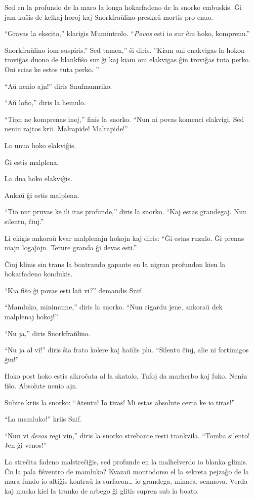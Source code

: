 Sed en la profundo de la maro la longa hokarfadeno de la snorko embuskis. Ĝi jam kuŝis de kelkaj horoj kaj Snorkfraŭlino preskaŭ mortis pro enuo.

``Gravas la ekscito,'' klarigis Mumintrolo. ``\emph{Povas} esti io sur ĉiu hoko, komprenu.''

Snorkfraŭlino iom suspiris.'' Sed tamen,'' ŝi diris. ''Kiam oni enakvigas la hokon troviĝas duono de blankfiŝo sur ĝi kaj kiam oni elakvigas ĝin troviĝas tuta perko. Oni scias ke estos tuta perko. ''

``Aŭ nenio ajn!'' diris Snufmumriko.

``Aŭ lofio,'' diris la hemulo.

``Tion ne komprenas inoj,'' finis la snorko. ``Nun ni povas komenci elakvigi. Sed neniu rajtos krii. Malrapide! Malrapide!''

La unua hoko elakviĝis.

Ĝi estis malplena.

La dua hoko elakviĝis.

Ankaŭ ĝi estis malplena.

``Tio nur pruvas ke ili iras profunde,'' diris la snorko. ``Kaj estas grandegaj. Nun silentu, ĉiuj.''

Li ekigis ankoraŭ kvar malplenajn hokojn kaj diris: ``Ĝi estas ruzulo. Ĝi prenas niajn logaĵojn. Terure granda ĝi devas esti.''

Ĉiuj klinis sin trans la boatrando gapante en la nigran profundon kien la hokarfadeno kondukis.

``Kia fiŝo ĝi povas esti laŭ vi?'' demandis Snif.

``Mamluko, minimume,'' diris la snorko. ``Nun rigardu jene, ankoraŭ dek malplenaj hokoj!''

``Nu ja,'' diris Snorkfraŭlino.

``Nu ja al vi!'' diris ŝia frato kolere kaj haŭlis plu. ``Silentu ĉiuj, alie ni fortimigos ĝin!''

Hoko post hoko estis alkroĉata al la skatolo. Tufoj da marherbo kaj fuko. Neniu fiŝo. Absolute nenio ajn.

Subite kriis la snorko: ``Atentu! Io tiras! Mi estas absolute certa ke io tiras!''

``La mamluko!'' kriis Snif.

``Nun vi \emph{devas} regi vin,'' diris la snorko strebante resti trankvila. ``Tomba silento! Jen ĝi venos!''

La streĉita fadeno malstreĉiĝis, sed profunde en la malhelverdo io blanka glimis. Ĉu la pala fiŝventro de mamluko? Kvazaŭ montodorso el la sekreta pejzaĝo de la mara fundo io altiĝis kontraŭ la surfacon{\ldots} io grandega, minaca, senmova. Verda kaj muska kiel la trunko de arbego ĝi glitis supren sub la boato.

